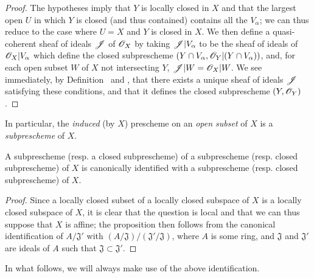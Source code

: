 \begin{proof}
The hypotheses imply that $Y$ is locally closed in $X$ and that the largest open $U$ in which $Y$ is closed (and thus contained) contains all the $V_\alpha$;
we can thus reduce to the case where $U=X$ and $Y$ is closed in $X$.
We then define a quasi-coherent sheaf of ideals $\mathscr{J}$ of $\mathscr{O}_X$ by taking $\mathscr{J}|V_\alpha$ to be the sheaf of ideals of $\mathscr{O}_X|V_\alpha$ which define the closed subprescheme $(Y\cap V_\alpha,\mathscr{O}_Y|(Y\cap V_\alpha))$, and, for each open subset $W$ of $X$ not intersecting $Y$, $\mathscr{J}|W=\mathscr{O}_X|W$.
We see immediately, by Definition~ and , that there exists a unique sheaf of ideals $\mathscr{J}$ satisfying these conditions, and that it defines the closed subprescheme $(Y,\mathscr{O}_Y)$.
\end{proof}

In particular, the \emph{induced} (by $X$) prescheme on an \emph{open subset} of $X$ is a \emph{subprescheme} of $X$.

\begin{proposition}[4.1.6]
\label{I.4.1.6}
A subprescheme (resp. a closed subprescheme) of a subprescheme
(resp. closed subprescheme) of $X$ is canonically identified with a subprescheme (resp. closed subprescheme) of $X$.
\end{proposition}

\begin{proof}
Since a locally closed subset of a locally closed subspace of $X$ is a locally closed subspace of $X$, it is clear  that the question is local and that we can thus suppose that $X$ is affine;
the proposition then follows from the canonical identification of $A/\mathfrak{J}'$ with $(A/\mathfrak{J})/(\mathfrak{J}'/\mathfrak{J})$, where $A$ is some ring, and $\mathfrak{J}$ and $\mathfrak{J}'$ are ideals of $A$ such that $\mathfrak{J}\subset\mathfrak{J}'$.
\end{proof}

In what follows, we will always make use of the above identification.

